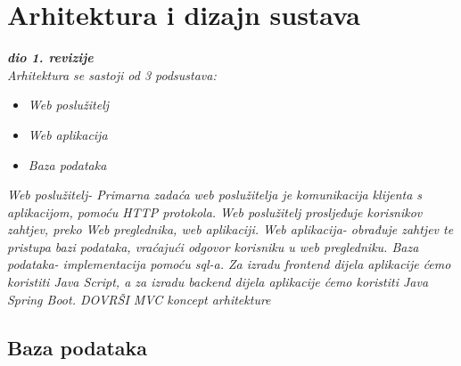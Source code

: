 \chapter{Arhitektura i dizajn sustava}
		
		\textbf{\textit{dio 1. revizije}}\\

		\textit{Arhitektura se sastoji od 3 podsustava:}
	\begin{itemize}
		\item 	\textit{Web poslužitelj}
		\item 	\textit{Web aplikacija}
		\item 	\textit{Baza podataka}		
	\end{itemize}
		\textit{
			Web poslužitelj- Primarna zadaća web poslužitelja je komunikacija klijenta s aplikacijom, pomoću HTTP protokola. Web poslužitelj prosljeđuje korisnikov 
			zahtjev, preko Web preglednika, web aplikaciji. 
			Web aplikacija- obrađuje zahtjev te pristupa bazi podataka, vraćajući odgovor korisniku u web pregledniku.
			Baza podataka- implementacija pomoću sql-a.
			Za izradu frontend dijela aplikacije ćemo koristiti Java Script, a za izradu backend dijela aplikacije ćemo koristiti Java Spring Boot. 
			DOVRŠI MVC koncept arhitekture}\\
			
		\section{Baza podataka}
			
